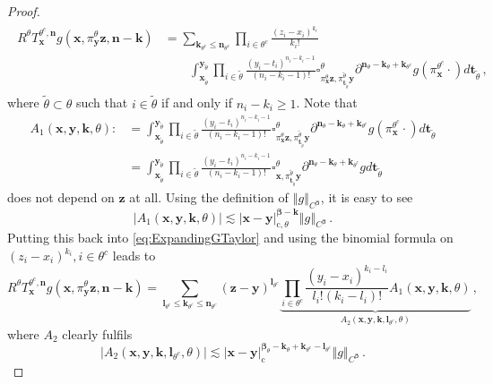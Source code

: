 \documentclass[10pt,a4paper]{amsart}
\def\fbeta{{\boldsymbol\beta}}
\def\fk{\mathbf k}\def\fl{\mathbf l}
\def\fl{\mathbf l}
\def\fn{\mathbf n}\def\fN{\mathbf N}
\def\ft{\mathbf t}
\def\fx{\mathbf x}
\def\fy{\mathbf y}\def\fz{\mathbf z}
\def\fz{\mathbf z}
\newcommand{\abs}[1]{\left\vert #1 \right\vert}
\newcommand{\norm}[1]{\left\Vert #1\right\Vert}
\begin{document}
\begin{proof}
    \begin{align}\begin{split}\label{eq:ExpandingGTaylor}
        R^\theta T_\fx^{\theta^c,\fn} g(\fx,\pi^\theta_\fy \fz,\fn-\fk) &= \sum_{\fk_{\theta^c}\le\fn_{\theta^c}} \prod_{i\in\theta^c} \frac{(z_i-x_i)^{k_i}}{k_i!} \\&\qquad\int_{\fx_{\tilde\theta}}^{\fy_{\tilde\theta}} \prod_{i\in\tilde\theta} \frac{(y_i-t_i)^{n_i-k_i-1}}{(n_i-k_i-1)!} \square^\theta_{\pi_\fx^\theta\fz,\pi_{\ft_{\tilde\theta}}^{\tilde\theta}\fy} \partial^{\fn_\theta-\fk_{\theta}+\fk_{\theta^c}}g(\pi_\fx^{\theta^c}\cdot)d\ft_{\tilde\theta}\,,
    \end{split}\end{align}
    where $\tilde\theta\subset\theta$ such that $i\in\tilde\theta$ if and only if $n_i-k_i\ge 1$. Note that
    \begin{align*}
        A_1(\fx,\fy,\fk,\theta) :&= \int_{\fx_{\tilde\theta}}^{\fy_{\tilde\theta}} \prod_{i\in\tilde\theta} \frac{(y_i-t_i)^{n_i-k_i-1}}{(n_i-k_i-1)!} \square^\theta_{\pi_\fx^\theta\fz,\pi_{\ft_{\tilde\theta}}^{\tilde\theta}\fy} \partial^{\fn_\theta-\fk_\theta+\fk_{\theta^c}}g(\pi_\fx^{\theta^c}\cdot)d\ft_{\tilde\theta}\\
        &=\int_{\fx_{\tilde\theta}}^{\fy_{\tilde\theta}} \prod_{i\in\tilde\theta} \frac{(y_i-t_i)^{n_i-k_i-1}}{(n_i-k_i-1)!} \square^\theta_{\fx,\pi_{\ft_{\tilde\theta}}^{\tilde\theta}\fy} \partial^{\fn_\theta-\fk_\theta+\fk_{\theta^c}}gd\ft_{\tilde\theta}
    \end{align*}
    does not depend on $\fz$ at all. Using the definition of $\norm{g}_{C^\fbeta}$, it is easy to see
    \[
        \abs{A_1(\fx,\fy,\fk,\theta)} \lesssim \abs{\fx-\fy}^{\fbeta-\fk}_{\text{c},\theta} \norm{g}_{C^\fbeta}\,.
    \]
    Putting this back into \eqref{eq:ExpandingGTaylor} and using the binomial formula on $(z_i-x_i)^{k_i}, i\in\theta^c$ leads to
    \begin{equation}\label{def_A_2}
        R^\theta T_\fx^{\theta^c,\fn} g(\fx,\pi^\theta_\fy \fz,\fn-\fk) = \sum_{\fl_{\theta^c}\le\fk_{\theta^c}\le\fn_{\theta^c}} (\fz-\fy)^{\fl_{\theta^c}}\underbrace{\prod_{i\in\theta^c} \frac{(y_i-x_i)^{k_i-l_i}}{l_i! (k_i-l_i)!}A_1(\fx,\fy,\fk,\theta)}_{A_2(\fx,\fy,\fk,\fl_{\theta^c},\theta)}\,,
    \end{equation}
    where $A_2$ clearly fulfils
    \[
    \abs{A_2(\fx,\fy,\fk,\fl_{\theta^c},\theta)} \lesssim \abs{\fx-\fy}^{\fbeta_\theta-\fk_\theta+\fk_{\theta^c}-\fl_{\theta^c}}_{\text{c}} \norm{g}_{C^\fbeta}\,.
    \]

\end{proof}
\end{document}
